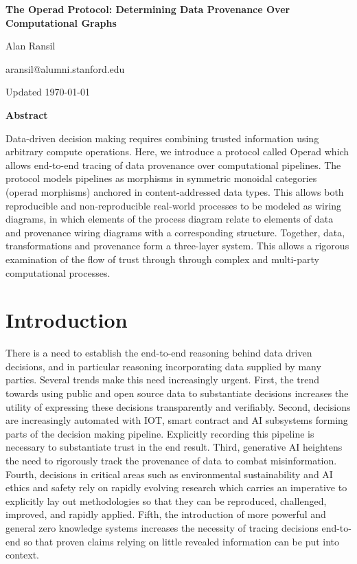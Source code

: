 \documentclass[9pt, oneside]{article}   	%
\begin{document}
\newpage


\begin{center}
\Large{\textbf{The Operad Protocol: Determining Data Provenance Over Computational Graphs}}
\vspace{1 cm}

\normalsize{}
Alan Ransil

\vspace{0.25 cm}
aransil@alumni.stanford.edu

\vspace{1 cm}
Updated \today

\vspace{1 cm}
\Large{\textbf{Abstract}}

\end{center}

\noindent Data-driven decision making requires combining trusted information using arbitrary compute operations. Here, we introduce a protocol called Operad which allows end-to-end tracing of data provenance over computational pipelines. The protocol models pipelines as morphisms in symmetric monoidal categories (operad morphisms) anchored in content-addressed data types. This allows both reproducible and non-reproducible real-world processes to be modeled as wiring diagrams, in which elements of the process diagram relate to elements of data and provenance wiring diagrams with a corresponding structure. Together, data, transformations and provenance form a three-layer system. This allows a rigorous examination of the flow of trust through through complex and multi-party computational processes. 


\setlength{\parskip}{0.1\baselineskip} %
\section{Introduction}

There is a need to establish the end-to-end reasoning behind data driven decisions, and in particular reasoning incorporating data supplied by many parties. Several trends make this need increasingly urgent. First, the trend towards using public and open source data to substantiate decisions increases the utility of expressing these decisions transparently and verifiably. Second, decisions are increasingly automated with IOT, smart contract and AI subsystems forming parts of the decision making pipeline. Explicitly recording this pipeline is necessary to substantiate trust in the end result. Third, generative AI heightens the need to rigorously track the provenance of data to combat misinformation. Fourth, decisions in critical areas such as environmental sustainability and AI ethics and safety rely on rapidly evolving research which carries an imperative to explicitly lay out methodologies so that they can be reproduced, challenged, improved, and rapidly applied. Fifth, the introduction of more powerful and general zero knowledge systems increases the necessity of tracing decisions end-to-end so that proven claims relying on little revealed information can be put into context.
\end{document}
